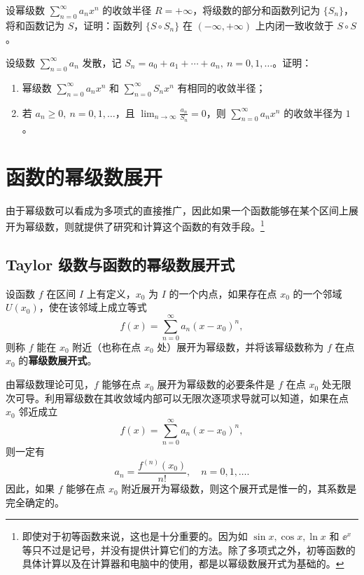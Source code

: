 \begin{xexercise}[12]
设幂级数 $\displaystyle\sum_{n=0}^{\infty}a_nx^n$ 的收敛半径 $R=+\infty$，将级数的部分和函数列记为 $\{S_n\}$，将和函数记为 $S$，证明：函数列 $\{S\circ S_n\}$ 在 $(-\infty,+\infty)$ 上内闭一致收敛于 $S\circ S$。
\end{xexercise}

\begin{xexercise}[13]
设级数 $\displaystyle\sum_{n=0}^{\infty}a_n$ 发散，记 $S_n=a_0+a_1+\cdots+a_n,\ n=0,1,\ldots$。证明：
  \begin{enumerate}[label=(\arabic*)]
    \item 幂级数 $\displaystyle\sum_{n=0}^{\infty}a_nx^n$ 和 $\displaystyle\sum_{n=0}^{\infty}S_nx^n$ 有相同的收敛半径；
    \item 若 $a_n\geqslant0,\ n=0,1,\ldots$，且 $\displaystyle\lim_{n\to\infty}\frac{a_n}{S_n}=0$，则 $\displaystyle\sum_{n=0}^{\infty}a_nx^n$ 的收敛半径为 $1$。
  \end{enumerate}
\end{xexercise}

\section{函数的幂级数展开}

由于幂级数可以看成为多项式的直接推广，因此如果一个函数能够在某个区间上展开为幂级数，则就提供了研究和计算这个函数的有效手段。\footnote{即使对于初等函数来说，这也是十分重要的。因为如 $\sin x,\cos x,\ln x$ 和 $\ee^x$ 等只不过是记号，并没有提供计算它们的方法。除了多项式之外，初等函数的具体计算以及在计算器和电脑中的使用，都是以幂级数展开式为基础的。}

\subsection{Taylor 级数与函数的幂级数展开式}

设函数 $f$ 在区间 $I$ 上有定义，$x_0$ 为 $I$ 的一个内点，如果存在点 $x_0$ 的一个邻域 $U(x_0)$，使在该邻域上成立等式
\[
  f(x)=\sum_{n=0}^{\infty}a_n(x-x_0)^n,
\]
则称 $f$ 能在 $x_0$ 附近（也称在点 $x_0$ 处）展开为幂级数，并将该幂级数称为 $f$ 在点 $x_0$ 的\textbf{幂级数展开式}。

由幂级数理论可见，$f$ 能够在点 $x_0$ 展开为幂级数的必要条件是 $f$ 在点 $x_0$ 处无限次可导。利用幂级数在其收敛域内部可以无限次逐项求导就可以知道，如果在点 $x_0$ 邻近成立
\[
  f(x)=\sum_{n=0}^{\infty}a_n(x-x_0)^n,
\]
则一定有
\[
  a_n=\frac{f^{(n)}(x_0)}{n!},\quad n=0,1,\ldots.
\]
因此，如果 $f$ 能够在点 $x_0$ 附近展开为幂级数，则这个展开式是惟一的，其系数是完全确定的。

